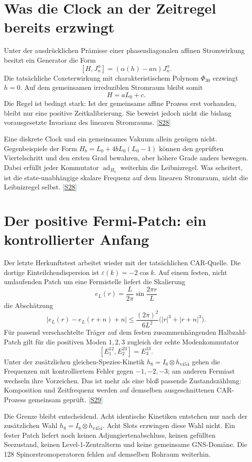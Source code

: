 \documentclass[11pt,a4paper,oneside,parskip=half,headings=normal,numbers=noenddot,bibliography=totoc]{scrreprt}
\newcommand{\src}[1]{\textcolor{teal}{\small[\hyperref[s:#1]{S#1}]}}
\begin{document}
\section{Was die Clock an der Zeitregel bereits erzwingt}
Unter der ausdrücklichen Prämisse einer phasendiagonalen affinen Stromwirkung besitzt ein Generator die Form
\[
 [H,J_n^\alpha]=(\alpha(h)-an)J_n^\alpha.
\]
Die tatsächliche Coxeterwirkung mit charakteristischem Polynom $\Phi_{30}$ erzwingt $h=0$. Auf dem gemeinsamen irreduziblen Stromraum bleibt somit
\[
 H=aL_0+c.
\]
Die Regel ist bedingt stark: Ist der gemeinsame affine Prozess erst vorhanden, bleibt nur eine positive Zeitkalibrierung. Sie beweist jedoch nicht die bislang vorausgesetzte Invarianz des linearen Stromraums. \src{28}

Eine diskrete Clock und ein gemeinsames Vakuum allein genügen nicht. Gegenbeispiele der Form $H_b=L_0+4bL_0(L_0-1)$ können den geprüften Viertelschritt und den ersten Grad bewahren, aber höhere Grade anders bewegen. Dabei erfüllt jeder Kommutator $\operatorname{ad}_{H_b}$ weiterhin die Leibnizregel. Was scheitert, ist die state-unabhängige skalare Frequenz auf dem linearen Stromraum, nicht die Leibnizregel selbst. \src{28}

\section{Der positive Fermi-Patch: ein kontrollierter Anfang}
Der letzte Herkunftstest arbeitet wieder mit der tatsächlichen CAR-Quelle. Die dortige Einteilchendispersion ist $\varepsilon(k)=-2\cos k$. Auf einem festen, nicht umlaufenden Patch um eine Fermistelle liefert die Skalierung
\[
 e_L(r)=\frac L{2\pi}\sin\frac{2\pi r}L
\]
die Abschätzung
\[
 \bigl|e_L(r)-e_L(r+n)+n\bigr|
 \le\frac{(2\pi)^2}{6L^2}\bigl(|r|^3+|r+n|^3\bigr).
\]
Für passend verschachtelte Träger auf dem festen zusammenhängenden Halbzahl-Patch gilt für die positiven Moden $1,2,3$ zugleich der echte Modenkommutator
\[
 [E^{12}_1,E^{23}_2]=E^{13}_3.
\]
Unter der zusätzlichen gleichen-Spezies-Kinetik $h_8=I_8\otimes h_{\mathrm{v454}}$ gehen die Frequenzen mit kontrolliertem Fehler gegen $-1,-2,-3$; am anderen Fermiast wechseln ihre Vorzeichen. Das ist mehr als eine bloß passende Zustandszählung: Komposition und Zeitfrequenz werden auf demselben ausgeschnittenen CAR-Prozess gemeinsam geprüft. \src{29}

Die Grenze bleibt entscheidend. Acht identische Kinetiken entstehen nur nach der zusätzlichen Wahl $h_8=I_8\otimes h_{\mathrm{v454}}$. Acht Slots erzwingen diese Wahl nicht. Ein fester Patch liefert noch keinen Adjungiertenabschluss, keinen gefüllten Seezustand, keinen Level-1-Zentralterm und keine gemeinsame GNS-Domäne. Die 128 Spinorstromoperatoren fehlen auf demselben Rohraum weiterhin.
\end{document}
